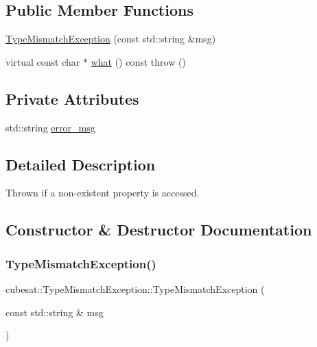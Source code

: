 \subsection*{Public Member Functions}
\begin{DoxyCompactItemize}
\item 
\hyperlink{classcubesat_1_1TypeMismatchException_ac036fa0c7175c5caa05c50df2c7d7fe2}{Type\+Mismatch\+Exception} (const std\+::string \&msg)
\item 
virtual const char $\ast$ \hyperlink{classcubesat_1_1TypeMismatchException_aa4af5e59a7722f33a47bd91b6377da64}{what} () const  throw ()
\end{DoxyCompactItemize}
\subsection*{Private Attributes}
\begin{DoxyCompactItemize}
\item 
std\+::string \hyperlink{classcubesat_1_1TypeMismatchException_a13bdeeacfdf75a481bc1071084c1cf6d}{error\+\_\+msg}
\end{DoxyCompactItemize}


\subsection{Detailed Description}
Thrown if a non-\/existent property is accessed. 

\subsection{Constructor \& Destructor Documentation}
\mbox{\label{classcubesat_1_1TypeMismatchException_ac036fa0c7175c5caa05c50df2c7d7fe2}} 
\subsubsection{\texorpdfstring{Type\+Mismatch\+Exception()}{TypeMismatchException()}}
{\footnotesize\ttfamily cubesat\+::\+Type\+Mismatch\+Exception\+::\+Type\+Mismatch\+Exception (\begin{DoxyParamCaption}\item[{const std\+::string \&}]{msg }\end{DoxyParamCaption})\hspace{0.3cm}{\ttfamily [inline]}}



